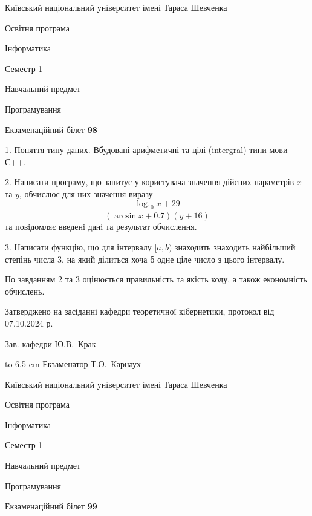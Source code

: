\documentclass[12pt, ukrainian]{article}
\begin{document}
\vspace{0.9cm}
{{\begin {scriptsize}\par
{ \center  Київський національний університет імені Тараса Шевченка \par}
{\parbox {5 cm}{Освітня програма \hfill}{\parbox {7 cm}{Інформатика\hfill}}\parbox {6 cm}{\hfill Семестр 1}}\par
{\parbox {5 cm} {Навчальний предмет \hfill}\parbox {7 cm}{Програмування \hfill}\parbox {6cm}{\hfill}\par}\vspace{-15pt} \end{scriptsize}}{\center Екзаменаційний білет \No \textbf { 98 }\par}}
{%
1. Поняття типу даних. Вбудовані арифметичні та цілі (intergral) типи мови С++.%
\par
2. Написати програму, що запитує у користувача значення дійсних параметрів $x$ та $y$, обчислює для них значення виразу 
$$\frac{\log_{10} x + 29}{(\arcsin x + 0.7) (y + 16)}$$ 
та повiдомляє введенi данi та результат обчислення.

\par
3. Написати функцію, що для інтервалу $[a, b)$ знаходить знаходить найбільший степінь числа 3, на який ділиться хоча б одне ціле число з цього інтервалу.

По завданням 2 та 3 оцінюється правильність та якість коду, а також економність обчислень.

}
{\smallskip\smallskip \begin {scriptsize} Затверджено на засіданні кафедри теоретичної кібернетики, протокол   від   07.10.2024 р.\par\smallskip\smallskip\smallskip\smallskip
{\parbox {6.5 cm} {Зав. кафедри \dotfill Ю.В.~Крак}}\hspace {0.7cm} {\hbox to 6.5 cm { Екзаменатор \dotfill Т.О.~Карнаух}} \end{scriptsize}}
\vspace{0.9cm}
{{\begin {scriptsize}\par
{ \center  Київський національний університет імені Тараса Шевченка \par}
{\parbox {5 cm}{Освітня програма \hfill}{\parbox {7 cm}{Інформатика\hfill}}\parbox {6 cm}{\hfill Семестр 1}}\par
{\parbox {5 cm} {Навчальний предмет \hfill}\parbox {7 cm}{Програмування \hfill}\parbox {6cm}{\hfill}\par}\vspace{-15pt} \end{scriptsize}}{\center Екзаменаційний білет \No \textbf { 99 }\par}}
\end{document}
